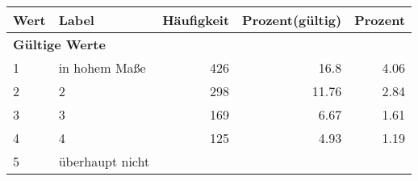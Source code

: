      \begin{longtable}{lXrrr}
     \toprule
     \textbf{Wert} & \textbf{Label} & \textbf{Häufigkeit} & \textbf{Prozent(gültig)} & \textbf{Prozent} \\
     \endhead
     \midrule
     \multicolumn{5}{l}{\textbf{Gültige Werte}}\\

     1 &
     \multicolumn{1}{X}{ in hohem Maße   } &


       \num{426} &
       \num[round-mode=places,round-precision=2]{16,8} &
         \num[round-mode=places,round-precision=2]{4,06} \\

     2 &
     \multicolumn{1}{X}{ 2   } &


       \num{298} &
       \num[round-mode=places,round-precision=2]{11,76} &
         \num[round-mode=places,round-precision=2]{2,84} \\

     3 &
     \multicolumn{1}{X}{ 3   } &


       \num{169} &
       \num[round-mode=places,round-precision=2]{6,67} &
         \num[round-mode=places,round-precision=2]{1,61} \\

     4 &
     \multicolumn{1}{X}{ 4   } &


       \num{125} &
       \num[round-mode=places,round-precision=2]{4,93} &
         \num[round-mode=places,round-precision=2]{1,19} \\

     5 &
     \multicolumn{1}{X}{ überhaupt nicht   } &



\end{longtable}
